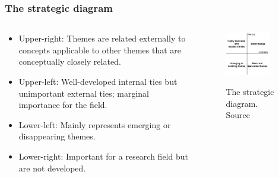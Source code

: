 \documentclass[aspectratio=169]{beamer}
\begin{document}
\begin{frame}
	\frametitle{The strategic diagram~\cite{cobo2011}}
	\begin{columns}
		\begin{column}{0.5\textwidth}
			\begin{itemize}
				\item Upper-right: Themes are related externally to concepts applicable
				      to other themes that are conceptually closely related.
				\item Upper-left: Well-developed internal ties but unimportant external
				      ties; marginal importance for the field.
				\item Lower-left: Mainly represents emerging or disappearing themes.
				\item Lower-right: Important for a research field but are not
				      developed.
			\end{itemize}
		\end{column}
		\begin{column}{0.5\textwidth}
			\begin{figure}
				\centering
				\includegraphics[width=0.8\textwidth]
				{./img/strategic_diagram_cobo2011.png}
				\label{fig:strategic_diagram}
				\caption{The strategic diagram. Source~\cite{cobo2011}}
			\end{figure}
		\end{column}
	\end{columns}
\end{frame}
\end{document}
